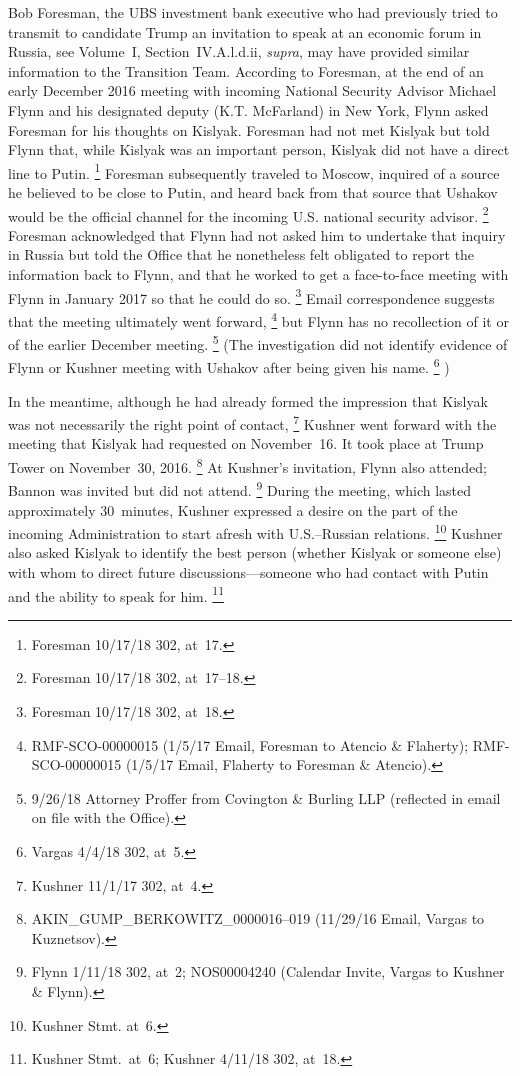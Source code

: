 Bob Foresman, the UBS investment bank executive who had previously tried to transmit to candidate Trump an invitation to speak at an economic forum in Russia, see Volume~I, Section~IV.A.l.d.ii, \textit{supra}, may have provided similar information to the Transition Team.
According to Foresman, at the end of an early December 2016 meeting with incoming National Security Advisor Michael Flynn and his designated deputy (K.T. McFarland) in New York, Flynn asked Foresman for his thoughts on Kislyak.
Foresman had not met Kislyak but told Flynn that, while Kislyak was an important person, Kislyak did not have a direct line to Putin.%
\footnote{Foresman 10/17/18 302, at~17.}
Foresman subsequently traveled to Moscow, inquired of a source he believed to be close to Putin, and heard back from that source that Ushakov would be the official channel for the incoming U.S. national security advisor.%
\footnote{Foresman 10/17/18 302, at~17--18.}
Foresman acknowledged that Flynn had not asked him to undertake that inquiry in Russia but told the Office that he nonetheless felt obligated to report the information back to Flynn, and that he worked to get a face-to-face meeting with Flynn in January 2017 so that he could do so.%
\footnote{Foresman 10/17/18 302, at~18.}
Email correspondence suggests that the meeting ultimately went forward,%
\footnote{RMF-SCO-00000015 (1/5/17 Email, Foresman to Atencio \& Flaherty);
RMF-SCO-00000015 (1/5/17 Email, Flaherty to Foresman \& Atencio).}
but Flynn has no recollection of it or of the earlier December meeting.%
\footnote{9/26/18 Attorney Proffer from Covington \& Burling LLP (reflected in email on file with the Office).}
(The investigation did not identify evidence of Flynn or Kushner meeting with Ushakov after being given his name.%
\footnote{Vargas 4/4/18 302, at~5.}%
)

In the meantime, although he had already formed the impression that Kislyak was not necessarily the right point of contact,%
\footnote{Kushner 11/1/17 302, at~4.}
Kushner went forward with the meeting that Kislyak had requested on November~16. It took place at Trump Tower on November~30, 2016.%
\footnote{AKIN\_GUMP\_BERKOWITZ\_0000016--019 (11/29/16 Email, Vargas to Kuznetsov).}
At Kushner's invitation, Flynn also attended; Bannon was invited but did not attend.%
\footnote{Flynn 1/11/18 302, at~2;
NOS00004240 (Calendar Invite, Vargas to Kushner \& Flynn).}
During the meeting, which lasted approximately 30~minutes, Kushner expressed a desire on the part of the incoming Administration to start afresh with U.S.--Russian relations.%
\footnote{Kushner Stmt. at~6.}
Kushner also asked Kislyak to identify the best person (whether Kislyak or someone else) with whom to direct future discussions---someone who had contact with Putin and the ability to speak for him.%
\footnote{Kushner Stmt.\ at~6;
Kushner 4/11/18 302, at~18.}

